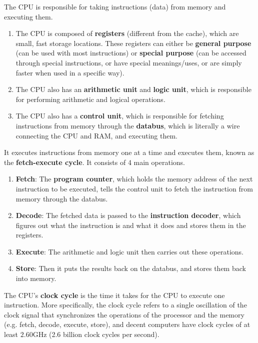    \begin{definition}
      The CPU is responsible for taking instructions (data) from memory and executing them. 
      \begin{enumerate} 
        \item The CPU is composed of \textbf{registers} (different from the cache), which are small, fast storage locations. These registers can either be \textbf{general purpose} (can be used with most instructions) or \textbf{special purpose} (can be accessed through special instructions, or have special meanings/uses, or are simply faster when used in a specific way).
        \item The CPU also has an \textbf{arithmetic unit} and \textbf{logic unit}, which is responsible for performing arithmetic and logical operations. 
        \item The CPU also has a \textbf{control unit}, which is responsible for fetching instructions from memory through the \textbf{databus}, which is literally a wire connecting the CPU and RAM, and executing them. 
      \end{enumerate}
      It executes instructions from memory one at a time and executes them, known as the \textbf{fetch-execute cycle}. It consists of 4 main operations. 
      \begin{enumerate} 
        \item \textbf{Fetch}: The \textbf{program counter}, which holds the memory address of the next instruction to be executed, tells the control unit to fetch the instruction from memory through the databus. 
        \item \textbf{Decode}: The fetched data is passed to the \textbf{instruction decoder}, which figures out what the instruction is and what it does and stores them in the registers.
        \item \textbf{Execute}: The arithmetic and logic unit then carries out these operations. 
        \item \textbf{Store}: Then it puts the results back on the databus, and stores them back into memory.
      \end{enumerate} 
      The CPU's \textbf{clock cycle} is the time it takes for the CPU to execute one instruction. More specifically, the clock cycle refers to a single oscillation of the clock signal that synchronizes the operations of the processor and the memory (e.g. fetch, decode, execute, store), and decent computers have clock cycles of at least $2.60$GHz (2.6 billion clock cycles per second). 
    \end{definition}

